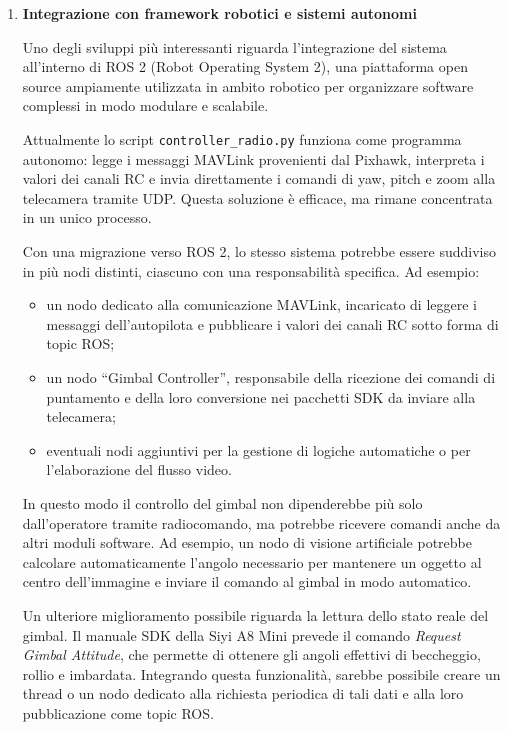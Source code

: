 \begin{enumerate}
\item \textbf{Integrazione con framework robotici e sistemi autonomi}

Uno degli sviluppi più interessanti riguarda l’integrazione del sistema
all’interno di ROS 2 (Robot Operating System 2)\cite{ros2}, una piattaforma open source
ampiamente utilizzata in ambito robotico per organizzare software complessi
in modo modulare e scalabile.

Attualmente lo script \texttt{controller\_radio.py} funziona come programma
autonomo: legge i messaggi MAVLink provenienti dal Pixhawk, interpreta
i valori dei canali RC e invia direttamente i comandi di yaw, pitch e zoom
alla telecamera tramite UDP. Questa soluzione è efficace, ma rimane
concentrata in un unico processo.

Con una migrazione verso ROS 2, lo stesso sistema potrebbe essere suddiviso
in più nodi distinti, ciascuno con una responsabilità specifica. Ad esempio:

\begin{itemize}
    \item un nodo dedicato alla comunicazione MAVLink, incaricato di leggere
    i messaggi dell’autopilota e pubblicare i valori dei canali RC sotto forma
    di topic ROS;

    \item un nodo “Gimbal Controller”, responsabile della ricezione dei comandi
    di puntamento e della loro conversione nei pacchetti SDK da inviare alla
    telecamera;

    \item eventuali nodi aggiuntivi per la gestione di logiche automatiche
    o per l’elaborazione del flusso video.
\end{itemize}

In questo modo il controllo del gimbal non dipenderebbe più solo
dall’operatore tramite radiocomando, ma potrebbe ricevere comandi anche
da altri moduli software. Ad esempio, un nodo di visione artificiale potrebbe
calcolare automaticamente l’angolo necessario per mantenere un oggetto
al centro dell’immagine e inviare il comando al gimbal in modo automatico.

Un ulteriore miglioramento possibile riguarda la lettura dello stato reale
del gimbal. Il manuale SDK della Siyi A8 Mini prevede il comando
\textit{Request Gimbal Attitude}, che permette di ottenere gli angoli effettivi
di beccheggio, rollio e imbardata. Integrando questa funzionalità, sarebbe
possibile creare un thread o un nodo dedicato alla richiesta periodica
di tali dati e alla loro pubblicazione come topic ROS.


\end{enumerate}
